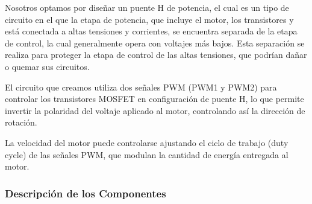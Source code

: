 \documentclass{article}
\begin{document}
Nosotros optamos por diseñar un puente H de potencia, el cual es un tipo de circuito en el que la etapa de potencia, que incluye el motor, los transistores y está conectada a altas tensiones y corrientes, se encuentra separada de la etapa de control, la cual generalmente opera con voltajes más bajos. Esta separación se realiza para proteger la etapa de control de las altas tensiones, que podrían dañar o quemar sus circuitos.

El circuito que creamos utiliza dos señales PWM (PWM1 y PWM2) para controlar los transistores MOSFET en configuración de puente H, lo que permite invertir la polaridad del voltaje aplicado al motor, controlando así la dirección de rotación. 

La velocidad del motor puede controlarse ajustando el ciclo de trabajo (duty cycle) de las señales PWM, que modulan la cantidad de energía entregada al motor.

\subsubsection{Descripción de los Componentes}
\end{document}

